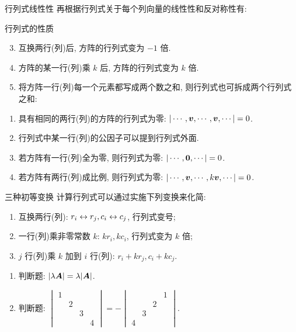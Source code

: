 \begin{frame}{行列式线性性}
	\onslide<+->
	再根据行列式关于每个列向量的线性性和反对称性有:
	\onslide<+->
	\begin{second}{行列式的性质}
		\begin{enumerate}
			\setcounter{enumi}{2}
			\item 互换两行(列)后, 方阵的行列式变为 $-1$ 倍.
			\item 方阵的某一行(列)乘 $k$ 后, 方阵的行列式变为 $k$ 倍.
			\item 将方阵一行(列)每一个元素都写成两个数之和, 则行列式也可拆成两个行列式之和:
		\end{enumerate}
	\end{second}
	\onslide<+->
	\begin{corollary}
		\begin{enumerate}
			\item 具有相同的两行(列)的方阵的行列式为零: $|\cdots,{\boldsymbol{v}},\cdots,{\boldsymbol{v}},\cdots|=0$.
			\item 行列式中某一行(列)的公因子可以提到行列式外面.
			\item 若方阵有一行(列)全为零, 则行列式为零: $|\cdots,{\bf0},\cdots|=0$.
			\item 若方阵有两行(列)成比例, 则行列式为零: $|\cdots,{\boldsymbol{v}},\cdots,k{\boldsymbol{v}},\cdots|=0$.
		\end{enumerate}
	\end{corollary}
\end{frame}


\begin{frame}{三种初等变换}
	\onslide<+->
	计算行列式可以通过实施下列变换来化简:
	\onslide<+->
	\begin{definition}[初等变换]
		\begin{enumerate}
			\item 互换两行(列): \alert{$r_i\leftrightarrow r_j, c_i\leftrightarrow c_j$}, 行列式变号;
			\item 一行(列)乘\alert{非零常数} $k$: \alert{$kr_i, kc_i$}, 行列式变为 $k$ 倍;
			\item $j$ 行(列)乘 $k$ 加到 $i$ 行(列): \alert{$r_i+kr_j, c_i+kc_j$}.
		\end{enumerate}
	\end{definition}
	\onslide<+->
	\begin{exercise}
		\begin{enumerate}
			\item 判断题: $|\lambda {\boldsymbol{A}}|=\lambda|{\boldsymbol{A}}|$. \visible<+->{\alert{$|\lambda \bfA|=\lambda^n|\bfA|$}}
			\item 判断题: $\begin{vmatrix}
				1&&&\\&2&&\\&&3&\\&&&4
			\end{vmatrix}=-\begin{vmatrix}
				&&&1\\&&2&\\&3&&\\4&&&
			\end{vmatrix}$. \visible<+->{\Huge\alert{$\times$}}
		\end{enumerate}
	\end{exercise}
\end{frame}


